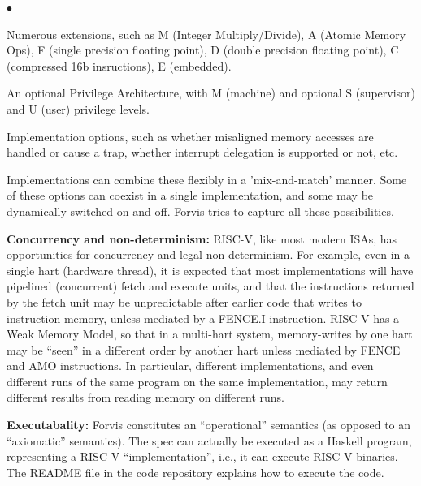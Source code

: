 \documentclass[11pt]{article}
\newenvironment{tightlist}%
{\begin{list}{$\bullet$}{%
    \setlength{\topsep}{0in}
    \setlength{\partopsep}{0in}
    \setlength{\itemsep}{0in}
    \setlength{\parsep}{0in}
    \setlength{\leftmargin}{1.5em}
    \setlength{\rightmargin}{0in}
    \setlength{\itemindent}{0in}
}
}%
{\end{list}
}
\begin{document}
\begin{itemize}
\begin{tightlist}
   \item Numerous extensions, such as M (Integer Multiply/Divide), A
    (Atomic Memory Ops), F (single precision floating point), D
    (double precision floating point), C (compressed 16b insructions), E (embedded).

   \item An optional Privilege Architecture, with M (machine) and
    optional S (supervisor) and U (user) privilege levels.

   \item Implementation options, such as whether misaligned memory
   accesses are handled or cause a trap, whether interrupt delegation
   is supported or not, etc.

  \end{tightlist}

  Implementations can combine these flexibly in a 'mix-and-match'
  manner.  Some of these options can coexist in a single
  implementation, and some may be dynamically switched on and off.
  Forvis tries to capture all these possibilities.

\item {\bf Concurrency and non-determinism:} RISC-V, like most modern
ISAs, has opportunities for concurrency and legal non-determinism.
For example, even in a single hart (hardware thread), it is expected
that most implementations will have pipelined (concurrent) fetch and
execute units, and that the instructions returned by the fetch unit
may be unpredictable after earlier code that writes to instruction
memory, unless mediated by a FENCE.I instruction.  RISC-V has a Weak
Memory Model, so that in a multi-hart system, memory-writes by one
hart may be ``seen'' in a different order by another hart unless
mediated by FENCE and AMO instructions.  In particular, different
implementations, and even different runs of the same program on the
same implementation, may return different results from reading memory
on different runs.

\item {\bf Executabality:} Forvis constitutes an ``operational''
semantics (as opposed to an ``axiomatic'' semantics).  The spec can
actually be executed as a Haskell program, representing a RISC-V
``implementation'', i.e., it can execute RISC-V binaries.  The README
file in the code repository explains how to execute the code.

\end{itemize}

\end{document}
